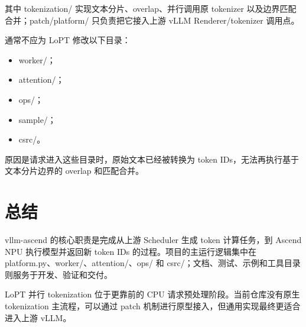 \documentclass[UTF8,11pt,a4paper]{ctexart}
\DeclareRobustCommand{\folder}[1]{\texttt{\detokenize{#1}}}
\def\folder#1{#1}%
\begin{document}
其中 \folder{tokenization/} 实现文本分片、overlap、并行调用原 tokenizer 以及边界匹配合并；\folder{patch/platform/} 只负责把它接入上游 vLLM Renderer/tokenizer 调用点。

通常不应为 LoPT 修改以下目录：

\begin{itemize}
  \item \folder{worker/}；
  \item \folder{attention/}；
  \item \folder{ops/}；
  \item \folder{sample/}；
  \item \folder{csrc/}。
\end{itemize}

原因是请求进入这些目录时，原始文本已经被转换为 token IDs，无法再执行基于文本分片边界的 overlap 和匹配合并。

\section{总结}

\folder{vllm-ascend} 的核心职责是完成从上游 Scheduler 生成 token 计算任务，到 Ascend NPU 执行模型并返回新 token IDs 的过程。项目的主运行逻辑集中在 \folder{platform.py}、\folder{worker/}、\folder{attention/}、\folder{ops/} 和 \folder{csrc/}；文档、测试、示例和工具目录则服务于开发、验证和交付。

LoPT 并行 tokenization 位于更靠前的 CPU 请求预处理阶段。当前仓库没有原生 tokenization 主流程，可以通过 patch 机制进行原型接入，但通用实现最终更适合进入上游 vLLM。
\end{document}
